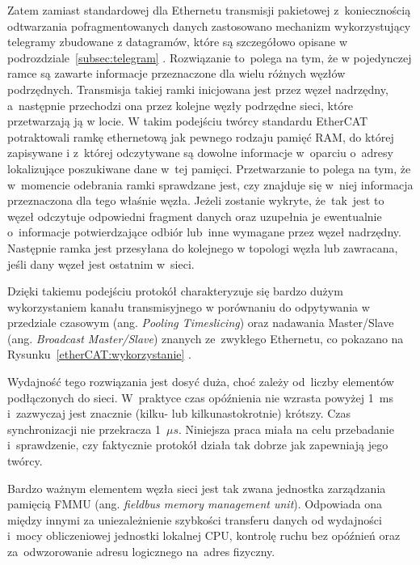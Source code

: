 Zatem zamiast standardowej dla Ethernetu transmisji pakietowej z~koniecznością odtwarzania pofragmentowanych danych zastosowano mechanizm wykorzystujący telegramy zbudowane z datagramów, które są szczegółowo opisane w podrozdziale~\ref{subsec:telegram} .
Rozwiązanie to~polega na tym, że w pojedynczej ramce są zawarte informacje przeznaczone dla wielu różnych węzłów podrzędnych. Transmisja takiej ramki inicjowana jest przez węzeł nadrzędny, a~następnie przechodzi ona przez kolejne węzły podrzędne sieci, które przetwarzają ją w locie. W takim podejściu twórcy standardu EtherCAT potraktowali ramkę ethernetową jak pewnego rodzaju pamięć RAM, do której zapisywane i z~której odczytywane są dowolne informacje w~oparciu o~adresy lokalizujące poszukiwane dane w~tej pamięci.
Przetwarzanie to polega na tym, że w~momencie odebrania ramki sprawdzane jest, czy znajduje się w~niej informacja przeznaczona dla tego właśnie węzła. Jeżeli zostanie wykryte, że~tak~jest to węzeł odczytuje odpowiedni fragment danych oraz uzupełnia je ewentualnie o~informacje potwierdzające odbiór lub~inne wymagane przez węzeł nadrzędny. Następnie ramka jest przesyłana do kolejnego w topologi węzła lub zawracana, jeśli dany węzeł jest ostatnim w~sieci. 

Dzięki takiemu podejściu protokół charakteryzuje się bardzo dużym wykorzystaniem kanału transmisyjnego w porównaniu do odpytywania w przedziale czasowym (ang. \textit{Pooling Timeslicing}) oraz nadawania Master/Slave (ang. \textit{Broadcast Master/Slave}) znanych ze~zwykłego Ethernetu, co pokazano na Rysunku~\ref{etherCAT:wykorzystanie} \cite{art3_etherCAT,art6_etherCAT,art7_etherCAT,ETG_doc}.

\vspace{-3mm}

Wydajność tego rozwiązania jest dosyć duża, choć zależy od~liczby elementów podłączonych do sieci. W~praktyce czas opóźnienia nie wzrasta powyżej 1~ms i~zazwyczaj jest znacznie (kilku- lub kilkunastokrotnie) krótszy. Czas synchronizacji nie przekracza 1~$\mu s$. Niniejsza praca miała na celu przebadanie i~sprawdzenie, czy faktycznie protokół działa tak dobrze jak zapewniają jego twórcy.

Bardzo ważnym elementem węzła sieci jest tak zwana jednostka zarządzania pamięcią FMMU (ang. \textit{fieldbus memory management unit}). Odpowiada ona między innymi za uniezależnienie szybkości transferu danych od wydajności i~mocy obliczeniowej jednostki lokalnej CPU, kontrolę ruchu bez opóźnień oraz za~odwzorowanie adresu logicznego na~adres fizyczny.

